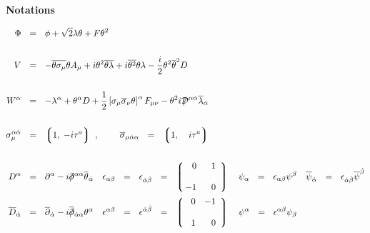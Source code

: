 \documentclass[14pt]{article}
\newcommand{\ov}{\overline}
\newcommand{\lgr}{\left\lgroup}
\newcommand{\rgr}{\right\rgroup}
\def\slashed#1{\setbox0=\hbox{$#1$}             %
   \dimen0=\wd0                                 %
   \setbox1=\hbox{/} \dimen1=\wd1               %
   \ifdim\dimen0>\dimen1                        %
      \rlap{\hbox to \dimen0{\hfil/\hfil}}      %
      #1                                        %
   \else                                        %
      \rlap{\hbox to \dimen1{\hfil$#1$\hfil}}   %
      /                                         %
   \fi}                                         %
\begin{document}
\begin{center}
        {\Large\bf Notations}
\end{center}

\begin{align*}
  \Phi  & ~~=~~  \phi  + \sqrt{2}\lambda\theta + F\theta^2  \\ \\
  V  &  ~~=~~      - \overline{\theta\sigma_\mu}\theta A_\mu + 
		 i \theta^2 \overline{\theta\lambda} +
 		 i \overline{\theta^2}\theta\lambda -
          	 \frac{i}{2} \theta^2\overline{\theta}^2 D \\ \\
  W^\alpha & ~~=~~  -\lambda^\alpha + \theta^\alpha D  +
              \frac{1}{2}
	\left[\sigma_\mu\overline{\sigma}_\nu\theta\right]^\alpha F_{\mu\nu} -
	\theta^2 i \slashed{\mathcal{D}}^{\alpha\dot{\alpha}}
	\overline{\lambda}_{\dot{\alpha}} \\ \\
  \sigma_\mu^{\alpha\dot{\alpha}} & ~~=~~ 
		\lgr 1,\; -i \tau^a \rgr~, ~~~~~~~
  \overline{\sigma}_{\mu\dot{\alpha}\alpha} ~~=~~ 
		\lgr 1,\; \phantom{+}i \tau^a \rgr \\ \\
   D^\alpha &  ~~=~~  \partial^\alpha - 
            i \slashed{\partial}^{\alpha\dot{\alpha}}
	    \overline{\theta}_{\dot{\alpha}}  
\quad
   \epsilon_{\alpha\beta} ~~=~~ 
    \epsilon_{\dot{\alpha}\dot{\beta}} ~~=~~
    \lgr \begin{array}{rr}
         \!\!  0 & ~~1 \\ \\
         \!\! -1 & ~~0 
    \end{array} \rgr
\quad
	    \psi_\alpha ~~=~~ \epsilon_{\alpha\beta}\psi^\beta 
\quad
	    \overline{\psi}_{\dot{\alpha}} ~~=~~ 
			  \epsilon_{\dot{\alpha}\dot{\beta}}
			  \overline{\psi}^{\dot{\beta}}\\ 
   \overline{D}_{\dot{\alpha}} & ~~=~~ \overline{\partial}_{\dot{\alpha}} -
            i \ov{\slashed{\partial}}{}_{\dot{\alpha}\alpha}\theta^\alpha 
\quad
   \epsilon^{\alpha\beta} ~~=~~ 
    \epsilon^{\dot{\alpha}\dot{\beta}} ~~=~~
    \lgr\begin{array}{rr}
         ~0 & -1 \\ \\
         ~1 &  0
    \end{array} \rgr
\quad
	    \psi^\alpha ~~=~~ \epsilon^{\alpha\beta}\psi_\beta 

\end{align*}
\end{document}
